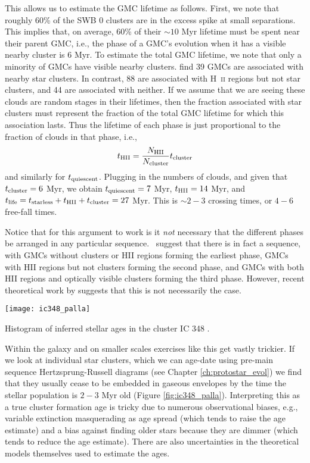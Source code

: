This allows us to estimate the GMC lifetime as follows. First, we note that roughly 60\% of the SWB 0 clusters are in the excess spike at small separations. This implies that, on average, 60\% of their $\sim 10$ Myr lifetime must be spent near their parent GMC, i.e., the phase of a GMC's evolution when it has a visible nearby cluster is 6 Myr. To estimate the total GMC lifetime, we note that only a minority of GMCs have visible nearby clusters. \citet{kawamura09a} find 39 GMCs are associated with nearby star clusters. In contrast, 88 are associated with H~\textsc{ii} regions but not star clusters, and 44 are associated with neither. If we assume that we are seeing these clouds are random stages in their lifetimes, then the fraction associated with star clusters must represent the fraction of the total GMC lifetime for which this association lasts. Thus the lifetime of each phase is just proportional to the fraction of clouds in that phase, i.e.,
\begin{equation}
t_{\rm HII} = \frac{N_{\rm HII}}{N_{\rm cluster}} t_{\rm cluster}
\end{equation}
and similarly for $t_{\rm quiescent}$.
Plugging in the numbers of clouds, and given that $t_{\rm cluster}=6$ Myr, we obtain $t_{\rm quiescent} = 7$ Myr, $t_{\rm HII} = 14$ Myr, and $t_{\rm life} = t_{\rm starless} + t_{\rm HII} + t_{\rm cluster} = 27$ Myr. This is $\sim 2-3$ crossing times, or $4-6$ free-fall times.

Notice that for this argument to work is it {\it not} necessary that the different phases be arranged in any particular sequence. \citeauthor{kawamura09a}~suggest that there is in fact a sequence, with GMCs without clusters or HII regions forming the earliest phase, GMCs with HII regions but not clusters forming the second phase, and GMCs with both HII regions and optically visible clusters forming the third phase. However, recent theoretical work by \citet{goldbaum11a} suggests that this is not necessarily the case.

\begin{marginfigure}
\texttt{[image: ic348\_palla]}
\caption[Histogram of stellar ages in IC 348]{
\label{fig:ic348_palla}
Histogram of inferred stellar ages in the cluster IC 348 \citet{palla00a}.
}
\end{marginfigure}

Within the galaxy and on smaller scales exercises like this get vastly trickier. If we look at individual star clusters, which we can age-date using pre-main sequence Hertzsprung-Russell diagrams (see Chapter \ref{ch:protostar_evol}) we find that they usually cease to be embedded in gaseous envelopes by the time the stellar population is $2-3$ Myr old (Figure \ref{fig:ic348_palla}). Interpreting this as a true cluster formation age is tricky due to numerous observational biases, e.g., variable extinction masquerading as age spread (which tends to raise the age estimate) and a bias against finding older stars because they are dimmer (which tends to reduce the age estimate). There are also uncertainties in the theoretical models themselves used to estimate the ages.

